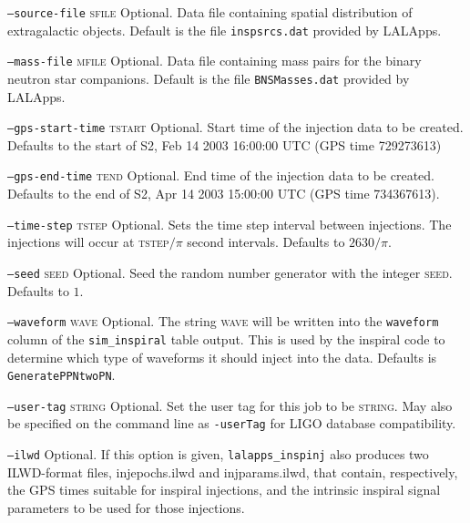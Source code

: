 \begin{entry}
\begin{entry}
\item[\texttt{--source-file} \textsc{sfile}]
Optional. Data file containing spatial distribution of  extragalactic  objects.
Default  is  the file \verb+inspsrcs.dat+ provided by LALApps.

\item[\texttt{--mass-file} \textsc{mfile}]
Optional. Data file containing mass pairs  for  the binary  neutron  star
companions.   Default is the file \verb+BNSMasses.dat+ provided by LALApps.

\item[\texttt{--gps-start-time} \textsc{tstart}]
Optional.  Start time of the injection data to be created. Defaults to the
start of S2, Feb 14 2003 16:00:00 UTC (GPS time 729273613)

\item[\texttt{--gps-end-time} \textsc{tend}]
Optional. End time of the injection data to be created. Defaults to the end of
S2, Apr 14 2003 15:00:00 UTC (GPS time 734367613).

\item[\texttt{--time-step} \textsc{tstep}]
Optional. Sets the time step interval between injections. The injections will
occur at \textsc{tstep}$/\pi$ second intervals. Defaults to $2630/\pi$.

\item[\texttt{--seed} \textsc{seed}]
Optional. Seed the random number generator with the integer \textsc{seed}.
Defaults to $1$.

\item[\texttt{--waveform} \textsc{wave}]
Optional. The string \textsc{wave} will be written into the \texttt{waveform}
column of the \texttt{sim\_inspiral} table output. This is used by the
inspiral code to determine which type of waveforms it should inject into the
data. Defaults is \texttt{GeneratePPNtwoPN}.

\item[\texttt{--user-tag} \textsc{string}] Optional. Set the user tag for this
job to be \textsc{string}. May also be specified on the command line as 
\texttt{-userTag} for LIGO database compatibility.

\item[\texttt{--ilwd}] Optional. If this option is given,
\verb+lalapps_inspinj+ also produces two ILWD-format files, injepochs.ilwd and
injparams.ilwd, that contain, respectively, the  GPS  times  suitable for
inspiral injections, and the intrinsic inspiral signal parameters to be used
for  those injections.


\end{entry}
\end{entry}
